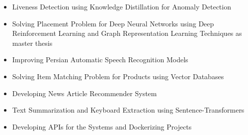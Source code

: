 \documentclass[10pt,a4paper,ragged2e,withhyper]{altacv}
\begin{document}
\clearpage

\begin{itemize}
	\item Liveness Detection using Knowledge Distillation for Anomaly Detection
\end{itemize}

\begin{paracol}{1}
	\begin{itemize}
		\item Solving Placement Problem for Deep Neural Networks using Deep Reinforcement Learning and Graph Representation Learning Techniques as master thesis
		\switchcolumn
	\end{itemize}
\end{paracol}





\vspace*{-1\multicolsep}
\begin{multicols}{2}
	\begin{itemize}
		\justifying
		\item \small{Improving Persian Automatic Speech Recognition Models}
		\item\small{Solving Item Matching Problem for Products using Vector Databases}
		\item\small{Developing News Article Recommender System}
		\item\small{Text Summarization and Keyboard Extraction using Sentence-Transformers}
		\item\small{Developing APIs for the Systems and Dockerizing Projects}
	\end{itemize}
\end{multicols}
\vspace*{-.5\multicolsep}
\end{document}

